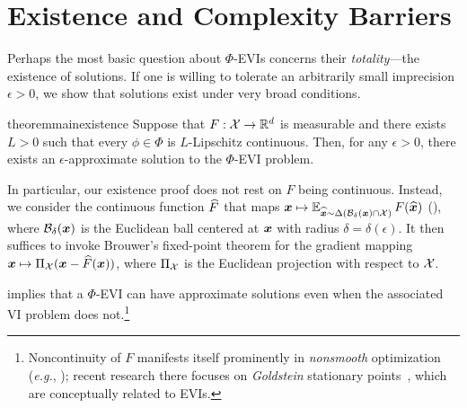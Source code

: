 \section{Existence and Complexity Barriers}
\label{sec:existence}

Perhaps the most basic question about $\Phi$-EVIs concerns their \emph{totality}---the existence of solutions. If one is willing to tolerate an arbitrarily small imprecision $\epsilon > 0$, we show that solutions exist under very broad conditions.

\begin{restatable}{theorem}{mainexistence}
    \label{theorem:existence}
    Suppose that $F : {\mathcal{X}} \to \mathbb R^d$ is measurable and there exists $L > 0$ such that every $\phi \in \Phi$ is $L$-Lipschitz continuous. Then, for any $\epsilon > 0$, there exists an $\epsilon$-approximate solution to the $\Phi$-EVI problem.
\end{restatable}


In particular, our existence proof does not rest on $F$ being continuous. 
Instead, we consider the continuous function $\widehat{F}$ that maps ${\bm{x}} \mapsto \operatorname*{\mathbb E}_{\widehat{{\bm{x}}} \sim \Delta({\mathcal{B}}_{\delta}({\bm{x}}) \cap {\mathcal{X}})} F(\widehat{{\bm{x}}})$ (), where ${\mathcal{B}}_\delta({\bm{x}})$ is the Euclidean ball centered at ${\bm{x}}$ with radius $\delta = \delta(\epsilon)$. It then suffices to invoke Brouwer's fixed-point theorem for the gradient mapping ${\bm{x}} \mapsto \Pi_{\mathcal{X}} ( {\bm{x}} - \widehat{F}({\bm{x}}) )$, where $\Pi_{\mathcal{X}}$ is the Euclidean projection with respect to ${\mathcal{X}}$.


 implies that a $\Phi$-EVI can have approximate solutions even when the associated VI problem does not.\footnote{Noncontinuity of $F$ manifests itself prominently in \emph{nonsmooth} optimization (\emph{e.g.}, \citealp{Zhang20:Complexity,Davis22:Gradient,Tian22:Finite,Jordan23:Deterministic}); recent research there focuses on \emph{Goldstein} stationary points~\citep{Goldstein77:Optimization}, which are conceptually related to EVIs.}

